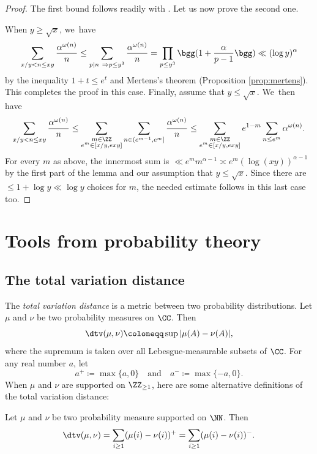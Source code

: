 \begin{proof}The first bound follows readily with \cite[Th.\,14.2]{Koukoulo19}. Let us now prove the second one.

When $y\ge \sqrt{x}$, we~have
\[
\sum_{x/y<n \le xy} \frac{ \alpha^{\omega(n)}}{n}\le \sum_{p|n\ \Rightarrow p \le y^3} \frac{ \alpha^{\omega(n)}}{n} = \prod_{p\le y^3} \bgg(1+\frac{\alpha}{p-1}\bgg) \ll (\log y)^\alpha
\]
by the inequality $1+t\le e^t$ and Mertens's theorem (Proposition \ref{prop:mertens}). This completes the proof in this case. Finally, assume that $y\le \sqrt{x}$. We~then have
\[
\sum_{x/y<n \le xy} \frac{ \alpha^{\omega(n)}}{n}
\le \sum_{\substack{m\in\ZZ \\ e^m\in[x/y,exy]}} \sum_{n\in(e^{m-1},e^m]} \frac{ \alpha^{\omega(n)}}{n}
\le \sum_{\substack{m\in\ZZ \\ e^m\in[x/y,exy]}} e^{1-m} \sum_{n\le e^m} \alpha^{\omega(n)}.
\]
For every $m$ as above, the innermost sum is $\ll e^m m^{\alpha-1} \asymp e^m (\log(xy))^{\alpha-1}$ by the first part of the lemma and our assumption that $y\le \sqrt{x}$. Since there are $\le1+\log y\ll \log y$ choices for $m$, the needed estimate follows in this last case too.
\end{proof}

\section{Tools from probability theory}

\subsection{The total variation distance}

The \textit{total variation distance} is a metric between two probability distributions. Let $\mu$ and $\nu$ be two probability measures on $\CC$. Then
\begin{equation}
\label{eq:dtv dfn}
\dtv(\mu, \nu) \coloneqq \sup |\mu(A) - \nu(A)|,
\end{equation}
where the supremum is taken over all Lebesgue-measurable subsets of $\CC$. For any real number $a$, let
\[
a^+ \coloneqq \max\{a, 0\} \quad \text{and} \quad a^- \coloneqq \max\{-a, 0\}.
\]When $\mu$ and $\nu$ are supported on $\ZZ_{\ge 1}$, here are some alternative definitions of the total variation distance:
\begin{lem}
\label{lem:equiv-def-dtv}
Let $\mu$ and $\nu$ be two probability measure supported on $\NN$. Then
\[
\dtv(\mu, \nu) = \sum_{i \ge 1} (\mu(i) - \nu(i))^+ = \sum_{i \ge 1} (\mu(i) - \nu(i))^-.
\]
\end{lem}

